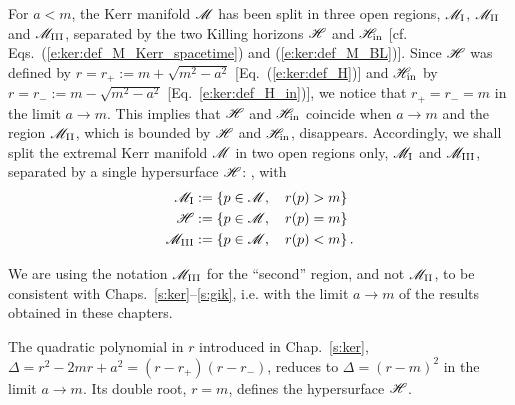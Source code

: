 For $a<m$, the Kerr manifold $\mathscr{M}$ has been split in three open regions,
$\mathscr{M}_{\rm I}$, $\mathscr{M}_{\rm II}$ and $\mathscr{M}_{\rm III}$,  separated by the two Killing
horizons $\mathscr{H}$ and $\mathscr{H}_{\rm in}$
[cf. Eqs.~(\ref{e:ker:def_M_Kerr_spacetime}) and (\ref{e:ker:def_M_BL})].
Since $\mathscr{H}$ was defined by $r=r_+:=m + \sqrt{m^2 - a^2}$ [Eq.~(\ref{e:ker:def_H})]
and $\mathscr{H}_{\rm in}$
by $r=r_-:=m - \sqrt{m^2 - a^2}$ [Eq.~\ref{e:ker:def_H_in})],
we notice that
$r_+ = r_- = m$ in the limit $a\to m$.
This implies that $\mathscr{H}$ and $\mathscr{H}_{\rm in}$ coincide when $a\to m$ and the region
$\mathscr{M}_{\rm II}$, which is bounded by $\mathscr{H}$ and $\mathscr{H}_{\rm in}$, disappears.
Accordingly, we shall split the extremal Kerr manifold $\mathscr{M}$ in two open regions only,
$\mathscr{M}_{\rm I}$ and $\mathscr{M}_{\rm III}$, separated by a single hypersurface $\mathscr{H}$:
\be
    ,
\ee
with
\begin{subequations}
\begin{align}
    \mathscr{M}_{\rm I} & := \left\{ p \in \mathscr{M}, \quad r(p) > m \right\} \\
    \mathscr{H} & := \left\{ p \in \mathscr{M}, \quad r(p) = m \right\} \label{e:exk:def_H}\\
    \mathscr{M}_{\rm III} & := \left\{ p \in \mathscr{M}, \quad r(p) < m \right\} .
\end{align}
\end{subequations}
\begin{remark}
We are using the notation $\mathscr{M}_{\rm III}$ for the ``second'' region, and not $\mathscr{M}_{\rm II}$,
to be consistent with Chaps.~\ref{s:ker}--\ref{s:gik}, i.e. with
the limit $a\to m$ of the results obtained in these chapters.
\end{remark}
The quadratic polynomial in $r$ introduced in Chap.~\ref{s:ker},
$\Delta=r^2 - 2 m r + a^2 = (r - r_+)(r - r_-)$, reduces to $\Delta = (r - m)^2$
in the limit $a\to m$. Its double root, $r=m$, defines the hypersurface $\mathscr{H}$.


